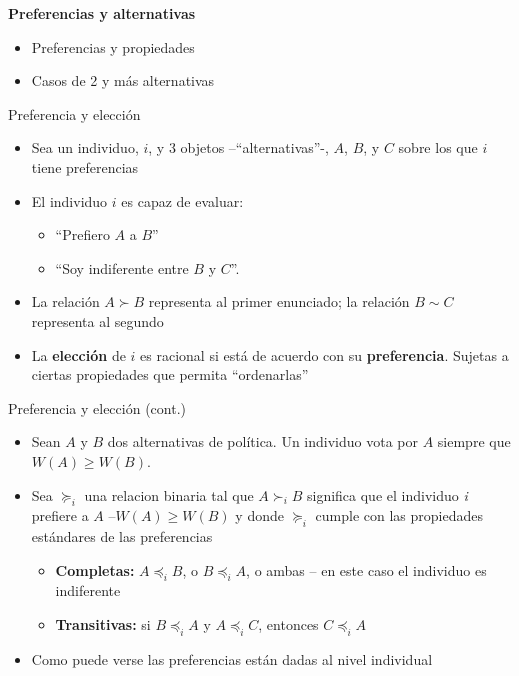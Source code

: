 \documentclass[
  ignorenonframetext,
]{beamer}
\providecommand{\tightlist}{%
  \setlength{\itemsep}{0pt}\setlength{\parskip}{0pt}}\usepackage{longtable,booktabs,array}
\begin{document}
\begin{frame}{\textbf{Preferencias y alternativas}}
\protect\hypertarget{preferencias-y-alternativas}{}
\begin{itemize}
\tightlist
\item
  Preferencias y propiedades
\item
  Casos de 2 y más alternativas
\end{itemize}

\begin{block}{Preferencia y elección}
\protect\hypertarget{preferencia-y-elecciuxf3n}{}
\begin{itemize}
\tightlist
\item
  Sea un individuo, \(i\), y 3 objetos --``alternativas''-, \(A\),
  \(B\), y \(C\) sobre los que \(i\) tiene preferencias
\item
  El individuo \(i\) es capaz de evaluar:

  \begin{itemize}
  \tightlist
  \item
    ``Prefiero \(A\) a \(B\)''
  \item
    ``Soy indiferente entre \(B\) y \(C\)''.
  \end{itemize}
\item
  La relación \(A \succ B\) representa al primer enunciado; la relación
  \(B \sim C\) representa al segundo
\item
  La \textbf{elección} de \(i\) es racional si está de acuerdo con su
  \textbf{preferencia}. Sujetas a ciertas propiedades que permita
  ``ordenarlas''
\end{itemize}
\end{block}

\begin{block}{Preferencia y elección (cont.)}
\protect\hypertarget{preferencia-y-elecciuxf3n-cont.}{}
\begin{itemize}
\tightlist
\item
  Sean \(A\) y \(B\) dos alternativas de política. Un individuo vota por
  \(A\) siempre que \(W(A) \geq W(B)\).
\item
  Sea \(\succeq_{i}\) una relacion binaria tal que \(A \succ_{i} B\)
  significa que el individuo \emph{i} prefiere a \(A\)
  --\(W(A) \geq W(B)\) y donde \(\succeq_{i}\) cumple con las
  propiedades estándares de las preferencias

  \begin{itemize}
  \tightlist
  \item
    \textbf{Completas:} \(A \preceq_{i} B\), o \(B \preceq_{i} A\), o
    ambas -- en este caso el individuo es indiferente
  \item
    \textbf{Transitivas:} si \(B \preceq_{i} A\) y \(A \preceq_{i} C\),
    entonces \(C \preceq_{i} A\)
  \end{itemize}
\item
  Como puede verse las preferencias están dadas al nivel individual
\end{itemize}
\end{block}


\end{frame}
\end{document}

